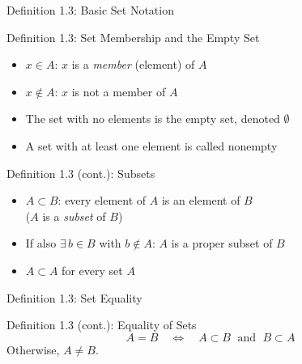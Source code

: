 \documentclass[aspectratio=169,12pt,t]{beamer}
\begin{document}
{%
\begin{frame}{Definition 1.3: Basic Set Notation}
  \begin{defblock}{Definition 1.3: Set Membership and the Empty Set}
    \begin{itemize}
      \item $x \in A$: \quad $x$ is a \emph{member} (element) of $A$
      \item $x \notin A$: \quad $x$ is not a member of $A$
      \item The set with no elements is the \alert{empty set}, denoted $\emptyset$
      \item A set with at least one element is called \alert{nonempty}
    \end{itemize}
  \end{defblock}

  \vspace{0.5em}
  \begin{defblock}{Definition 1.3 (cont.): Subsets}
    \begin{itemize}
      \item $A \subset B$: \quad every element of $A$ is an element of $B$ \\ {\small ($A$ is a \emph{subset} of $B$)}
      \item If also $\exists\, b \in B$ with $b \notin A$: \quad $A$ is a \alert{proper subset} of $B$
      \item $A \subset A$ for every set $A$
    \end{itemize}
  \end{defblock}

\end{frame}

\begin{frame}{Definition 1.3: Set Equality}
  \begin{defblock}{Definition 1.3 (cont.): Equality of Sets}
    \[
      A = B \quad\Longleftrightarrow\quad A \subset B \;\text{ and }\; B \subset A
    \]
    Otherwise, $A \neq B$.
  \end{defblock}


\end{frame}}
\end{document}
